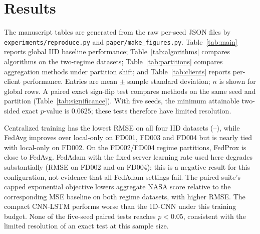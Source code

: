 \section{Results}
\label{sec:results}

The manuscript tables are generated from the raw per-seed JSON files by \texttt{experiments/reproduce.py} and \texttt{paper/make\_figures.py}. Table~\ref{tab:main} reports global IID baseline performance; Table~\ref{tab:algorithms} compares algorithms on the two-regime datasets; Table~\ref{tab:partitions} compares aggregation methods under partition shift; and Table~\ref{tab:clients} reports per-client performance. Entries are mean $\pm$ sample standard deviation; $n$ is shown for global rows. A paired exact sign-flip test compares methods on the same seed and partition (Table~\ref{tab:significance}). With five seeds, the minimum attainable two-sided exact $p$-value is $0.0625$; these tests therefore have limited resolution.

Centralized training has the lowest RMSE on all four IID datasets (\SuiteCentralIidRmseMin{}--\SuiteCentralIidRmseMax{}), while FedAvg improves over local-only on FD001, FD003 and FD004 but is nearly tied with local-only on FD002. On the FD002/FD004 regime partitions, FedProx is close to FedAvg. FedAdam with the fixed server learning rate used here degrades substantially (RMSE \SuiteFdTwoRegimeFedAdamRmse{} on FD002 and \SuiteFdFourRegimeFedAdamRmse{} on FD004); this is a negative result for this configuration, not evidence that all FedAdam settings fail. The paired suite's capped exponential objective lowers aggregate NASA score relative to the corresponding MSE baseline on both regime datasets, with higher RMSE. The compact CNN-LSTM performs worse than the 1D-CNN under this training budget. None of the five-seed paired tests reaches $p<0.05$, consistent with the limited resolution of an exact test at this sample size.

\begin{table}[t]
\centering
\caption{Centralized, isolated local and FedAvg baselines on IID partitions. Values are mean $\pm$ sample standard deviation across five seeds. NASA scores are summed over engines and should only be compared within the same dataset.}
\label{tab:main}

\end{table}

\begin{table}[t]
\centering
\caption{Global algorithm comparison on regime-grouped FD002 and FD004. ``exp.'' denotes the paired suite's capped exponential NASA-score training objective, not \texttt{AsymmetricRULLoss}.}
\label{tab:algorithms}

\end{table}

